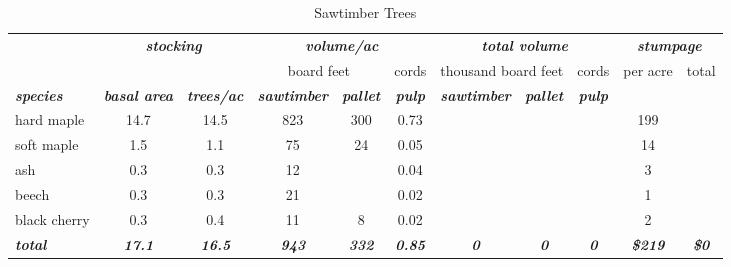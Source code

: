 \documentclass[landscape]{article}
\begin{document}
\begin{table}[H]

\caption{\label{tab:unnamed-chunk-12}Sawtimber Trees}
\fontsize{10}{12}\selectfont
\begin{tabular}[t]{lcccccccccc}
\toprule
\multicolumn{1}{c}{\em{\textbf{ }}} & \multicolumn{2}{c}{\em{\textbf{stocking}}} & \multicolumn{3}{c}{\em{\textbf{volume/ac }}} & \multicolumn{3}{c}{\em{\textbf{total volume}}} & \multicolumn{2}{c}{\em{\textbf{stumpage}}} \\
\cmidrule(l{3pt}r{3pt}){2-3} \cmidrule(l{3pt}r{3pt}){4-6} \cmidrule(l{3pt}r{3pt}){7-9} \cmidrule(l{3pt}r{3pt}){10-11}
\multicolumn{3}{c}{ } & \multicolumn{2}{c}{board feet} & \multicolumn{1}{c}{cords} & \multicolumn{2}{c}{thousand board feet} & \multicolumn{1}{c}{cords} & \multicolumn{1}{c}{per acre} & \multicolumn{1}{c}{total} \\
\cmidrule(l{3pt}r{3pt}){4-5} \cmidrule(l{3pt}r{3pt}){6-6} \cmidrule(l{3pt}r{3pt}){7-8} \cmidrule(l{3pt}r{3pt}){9-9} \cmidrule(l{3pt}r{3pt}){10-10} \cmidrule(l{3pt}r{3pt}){11-11}
\rowcolor[HTML]{DCDCDC}  \em{\textbf{species}} & \em{\textbf{basal area}} & \em{\textbf{trees/ac}} & \em{\textbf{sawtimber}} & \em{\textbf{pallet}} & \em{\textbf{pulp}} & \em{\textbf{sawtimber}} & \em{\textbf{pallet}} & \em{\textbf{pulp}} & \em{\textbf{ }} & \em{\textbf{ }}\\
\midrule
\rowcolor{gray!6}  hard maple & 14.7 & 14.5 & 823 & 300 & 0.73 &  &  &  & 199 & \\
 
soft maple & 1.5 & 1.1 & 75 & 24 & 0.05 &  &  &  & 14 & \\
 
\rowcolor{gray!6}  ash & 0.3 & 0.3 & 12 &  & 0.04 &  &  &  & 3 & \\
 
beech & 0.3 & 0.3 & 21 &  & 0.02 &  &  &  & 1 & \\
 
\rowcolor{gray!6}  black cherry & 0.3 & 0.4 & 11 & 8 & 0.02 &  &  &  & 2 & \\
 
\rowcolor[HTML]{DCDCDC}  \em{\textbf{total}} & \em{\textbf{17.1}} & \em{\textbf{16.5}} & \em{\textbf{943}} & \em{\textbf{332}} & \em{\textbf{0.85}} & \em{\textbf{0}} & \em{\textbf{0}} & \em{\textbf{0}} & \em{\textbf{\$219}} & \em{\textbf{\$0}}\\
\bottomrule
\end{tabular}
\end{table}
\end{document}
